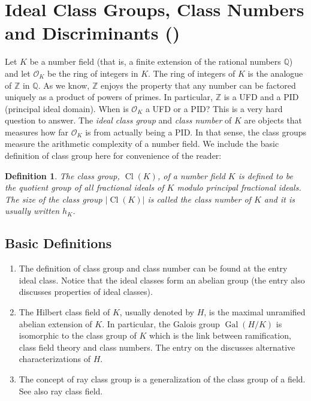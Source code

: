 \documentclass[12pt]{article}
\newtheorem{defn}{Definition}
\newcommand{\Ints}{\mathbb{Z}}
\newcommand{\Rats}{\mathbb{Q}}
\newcommand{\Gal}{\operatorname{Gal}}
\newcommand{\Cl}{\operatorname{Cl}}
\begin{document}
\section*{Ideal Class Groups, Class Numbers and Discriminants ()}

Let $K$ be a number field (that is, a finite extension of the rational numbers $\Rats$) and let $\mathcal{O}_K$ be the ring of integers in $K$. The ring of integers of $K$ is the analogue of $\Ints$ in $\Rats$. As we know, $\Ints$ enjoys the property that any number can be factored uniquely as a product of powers of primes. In particular, $\Ints$ is a UFD and a PID (principal ideal domain). When is $\mathcal{O}_K$ a UFD or a PID? This is a very hard question to answer. The {\it ideal class group} and {\it class number} of $K$ are objects that measures how far $\mathcal{O}_K$ is from actually being a PID. In that sense, the class groups measure the arithmetic complexity of a number field. We include the basic definition of class group here for convenience of the reader:

\begin{defn}
The class group, $\Cl(K)$, of a number field $K$ is defined to be the quotient group of all fractional ideals of $K$ modulo principal fractional ideals. The size of the class group $|\Cl(K)|$ is called the class number of $K$ and it is usually written $h_K$.
\end{defn}

\addtocounter{section}{1}
\subsection{Basic Definitions}
\begin{enumerate}
\item The definition of class group and class number can be found at the entry ideal class. Notice that the ideal classes form an abelian group (the entry also discusses properties of ideal classes).
\item The Hilbert class field of $K$, usually denoted by $H$, is the maximal unramified abelian extension of $K$. In particular, the Galois group $\Gal(H/K)$ is isomorphic to the class group of $K$ which is the link between ramification, class field theory and class numbers. The entry on the  discusses alternative characterizations of $H$. 
\item The concept of ray class group is a generalization of the class group of a field. See also ray class field. 
\end{enumerate}
\end{document}
